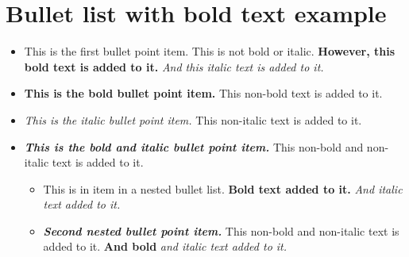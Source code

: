 \documentclass[a4paper]{report}
\begin{document}
\chapter{Bullet list with bold text example}
\begin{itemize}
\item This is the first bullet point item. This is not bold or italic.\textbf{ However, this bold text is added to it.}\textit{ And this italic text is added to it.}
\item \textbf{This is the bold bullet point item.} This non-bold text is added to it.
\item \textit{This is the italic bullet point item.} This non-italic text is added to it.
\item \textit{\textbf{This is the bold and italic bullet point item.}} This non-bold and non-italic text is added to it.
\begin{itemize}
\item This is in item in a nested bullet list.\textbf{ Bold text added to it.}\textit{ And italic text added to it.}
\item \textit{\textbf{Second nested bullet point item.}} This non-bold and non-italic text is added to it.\textbf{ And bold}\textit{ and italic text added to it.}
\end{itemize}
\end{itemize}
\end{document}
